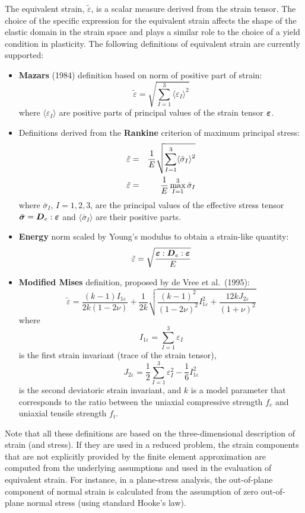 \documentclass[a4paper]{article}
\newcommand{\mbf}[1]{\mbox{\boldmath$#1$}}
\begin{document}
The equivalent strain, $\tilde\varepsilon$, is a scalar measure derived from the
strain tensor. The choice of the specific expression
for the equivalent strain affects the shape of the elastic domain
in the strain space and plays a similar role to the choice of a yield
condition in plasticity.
The following definitions of equivalent strain are currently supported:
\begin{itemize}
\item
{\bf Mazars} (1984) definition based on norm of positive part of strain:
\begin{equation}
\label{mazars}
\tilde\varepsilon=\sqrt{\displaystyle{\sum_{I=1}^{3}}\langle\varepsilon_I\rangle^2}
\end{equation}
where $\langle\varepsilon_I\rangle$ are positive parts of 
principal values of the strain tensor $\mbf{\varepsilon}$.
\item
Definitions derived from the {\bf Rankine} criterion of maximum principal stress:
\begin{eqnarray}
\label{rankinesmooth}
\tilde\varepsilon&=&
{{1}\over{E}}\sqrt{\displaystyle{\sum_{I=1}^{3}}\langle\bar\sigma_I\rangle^2}
\\
\label{rankinestandard}
\tilde\varepsilon&=&
{{1}\over{E}}\max_{I=1}^{3}\bar\sigma_I
\end{eqnarray}
where
$\bar\sigma_I$, $I=1,2,3$, are the principal 
values of the
effective stress tensor $\bar{\mbf{\sigma}} = \mbf{D}_e:\mbf{\varepsilon}$
and $\langle\bar\sigma_I\rangle$ are their positive parts.
\item
{\bf Energy} norm scaled by Young's modulus to obtain
a strain-like quantity:
\begin{equation}
\label{energynorm}
\tilde\varepsilon=\sqrt{{\mbf{\varepsilon}:\mbf{D}_e:\mbf{\varepsilon}}\over{E}}
\end{equation}
\item
{\bf Modified Mises} definition, proposed by de Vree et al.~(1995):
\begin{equation}
\label{modifiedmises}
\tilde\varepsilon=\frac{(k-1)I_{1\varepsilon}}{2k(1-2\nu)} + \frac{1}{2k}\sqrt{\frac{(k-1)^2}{(1-2\nu)^2}I_{1\varepsilon}^2+\frac{12 k J_{2\varepsilon}}{(1+\nu)^2}} 
\end{equation}
where $$
I_{1\varepsilon} = \sum_{I=1}^3\varepsilon_I
$$
is the first strain invariant (trace of the strain tensor),
$$
J_{2\varepsilon} = \frac{1}{2}\sum_{I=1}^3 \varepsilon_I^2-\frac{1}{6}I_{1\varepsilon}^2
$$  
is the second deviatoric strain invariant,
and $k$ is a model parameter that corresponds to the ratio between the uniaxial
compressive strength $f_c$ and  uniaxial tensile strength $f_t$.
\end{itemize}
Note that all these definitions are based on the three-dimensional
description of strain (and stress). If they are used in a reduced
problem, the strain components that are not explicitly provided by
the finite element approximation are computed from the underlying 
assumptions and used in the evaluation of equivalent strain.
For instance, in a plane-stress analysis, the out-of-plane component
of normal strain is calculated from the assumption of zero
out-of-plane normal stress (using standard Hooke's law).
\end{document}
